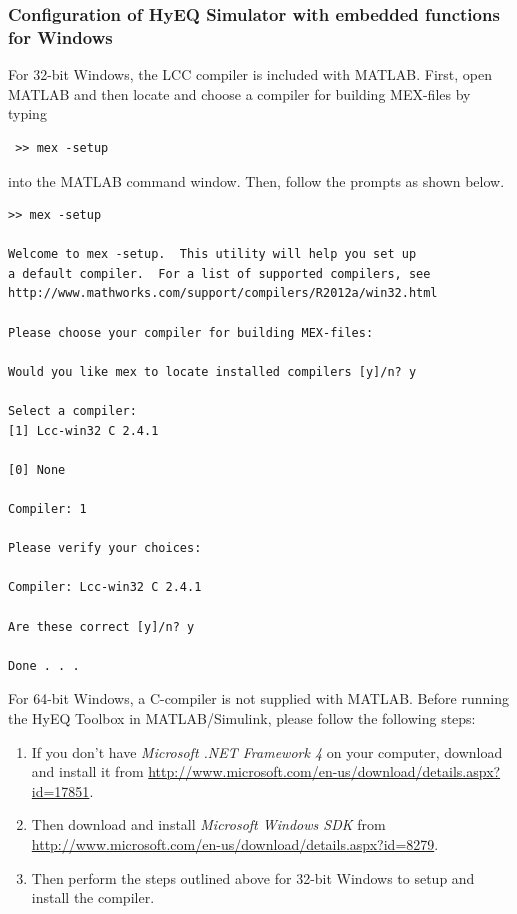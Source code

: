 \documentclass{article}
\begin{document}
\subsubsection{Configuration of HyEQ Simulator with embedded functions for Windows}
For 32-bit Windows, the LCC compiler is included with MATLAB. First, open MATLAB and then locate and choose a compiler for building MEX-files by typing \begin{verbatim} >> mex -setup \end{verbatim}
into the MATLAB command window. Then, follow the prompts as shown below.

\begin{verbatim}
>> mex -setup

Welcome to mex -setup.  This utility will help you set up
a default compiler.  For a list of supported compilers, see
http://www.mathworks.com/support/compilers/R2012a/win32.html

Please choose your compiler for building MEX-files:

Would you like mex to locate installed compilers [y]/n? y

Select a compiler:
[1] Lcc-win32 C 2.4.1

[0] None

Compiler: 1

Please verify your choices:

Compiler: Lcc-win32 C 2.4.1

Are these correct [y]/n? y

Done . . .
\end{verbatim}

For 64-bit Windows, a C-compiler is not supplied with MATLAB. Before running the HyEQ Toolbox in MATLAB/Simulink, please follow the following steps:

\begin{enumerate}
\item If you don't have {\em Microsoft .NET Framework 4} on your computer, download and install it from
\url{http://www.microsoft.com/en-us/download/details.aspx?id=17851}.
\item Then download and install {\em Microsoft Windows SDK} from
\url{http://www.microsoft.com/en-us/download/details.aspx?id=8279}.
\item Then perform the steps outlined above for 32-bit Windows to setup and install the compiler.
\end{enumerate}
\end{document}

